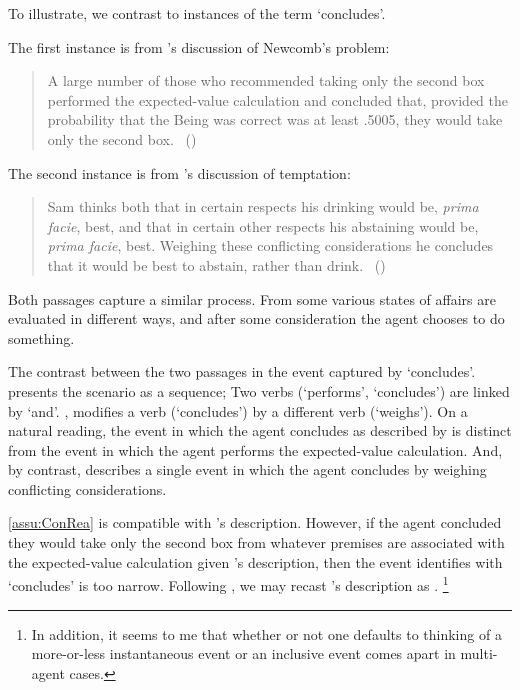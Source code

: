 \begin{note}
  To illustrate, we contrast to instances of the term `concludes'.

  The first instance is from \citeauthor{Gardner:1986wp}'s discussion of Newcomb's problem:

  \begin{quote}
    A large number of those who recommended taking only the second box performed the expected-value calculation and concluded that, provided the probability that the Being was correct was at least .5005, they would take only the second box.%
    \mbox{ }\hfill\mbox{(\citeyear[166]{Gardner:1986wp})}
  \end{quote}

  The second instance is from \citeauthor{Bratman:1979aa}'s discussion of temptation:

  \begin{quote}
    Sam thinks both that in certain respects his drinking would be, \emph{prima facie}, best, and that in certain other respects his abstaining would be, \emph{prima facie}, best.
    Weighing these conflicting considerations he concludes that it would be best to abstain, rather than drink.%
    \mbox{ }\hfill\mbox{(\citeyear[156]{Bratman:1979aa})}
  \end{quote}

  Both passages capture a similar process.
  From some \agpe{} various states of affairs are evaluated in different ways, and after some consideration the agent chooses to do something.

  The contrast between the two passages in the event captured by `concludes'.
  \citeauthor{Gardner:1986wp} presents the scenario as a sequence;
  Two verbs (`performs', `concludes') are linked by `and'.
  \citeauthor{Bratman:1979aa}, modifies a verb (`concludes') by a different verb (`weighs').
  On a natural reading, the event in which the agent concludes as described by \citeauthor{Gardner:1986wp} is distinct from the event in which the agent performs the expected-value calculation.
  And, by contrast, \citeauthor{Bratman:1979aa} describes a single event in which the agent concludes by weighing conflicting considerations.

  \autoref{assu:ConRea} is compatible with \citeauthor{Bratman:1979aa}'s description.
  However, if the agent concluded they would take only the second box from whatever premises are associated with the expected-value calculation given \citeauthor{Gardner:1986wp}'s description, then the event \citeauthor{Gardner:1986wp} identifies with `concludes' is too narrow.
  Following \citeauthor{Bratman:1979aa}, we may recast \citeauthor{Gardner:1986wp}'s description as .%
  \footnote{
    In addition, it seems to me that whether or not one defaults to thinking of a more-or-less instantaneous event or an inclusive event comes apart in multi-agent cases.

}
\end{note}

